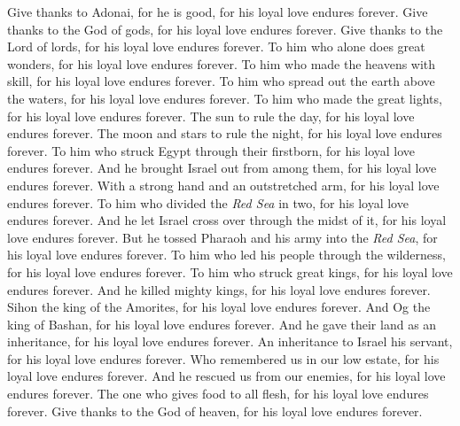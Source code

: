 \begin{biblechapter} %
 Give thanks to Adonai, for he is good, 
for his loyal love endures forever.
\verse Give thanks to the God of gods, 
for his loyal love endures forever.
\verse Give thanks to the Lord of lords, 
for his loyal love endures forever.
\verse To him who alone does great wonders, 
for his loyal love endures forever.
\verse To him who made the heavens with skill, 
for his loyal love endures forever.
\verse To him who spread out the earth above the waters, 
for his loyal love endures forever.
\verse To him who made the great lights, 
for his loyal love endures forever.
\verse The sun to rule the day, 
for his loyal love endures forever.
\verse The moon and stars to rule the night, 
for his loyal love endures forever.
\verse To him who struck Egypt through their firstborn, 
for his loyal love endures forever.
\verse And he brought Israel out from among them, 
for his loyal love endures forever.
\verse With a strong hand and an outstretched arm, 
for his loyal love endures forever.
\verse To him who divided the \textit{Red Sea} in two, 
for his loyal love endures forever.
\verse And he let Israel cross over through the midst of it, 
for his loyal love endures forever.
\verse But he tossed Pharaoh and his army into the \textit{Red Sea}, 
for his loyal love endures forever.
\verse To him who led his people through the wilderness, 
for his loyal love endures forever.
\verse To him who struck great kings, 
for his loyal love endures forever.
\verse And he killed mighty kings, 
for his loyal love endures forever.
\verse Sihon the king of the Amorites, 
for his loyal love endures forever.
\verse And Og the king of Bashan, 
for his loyal love endures forever.
\verse And he gave their land as an inheritance, 
for his loyal love endures forever.
\verse An inheritance to Israel his servant, 
for his loyal love endures forever.
\verse Who remembered us in our low estate, 
for his loyal love endures forever.
\verse And he rescued us from our enemies, 
for his loyal love endures forever.
\verse The one who gives food to all flesh, 
for his loyal love endures forever.
\verse Give thanks to the God of heaven, 
for his loyal love endures forever.
\end{biblechapter}

